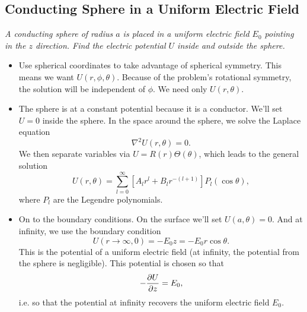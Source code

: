 \documentclass[11pt, a4paper]{article}
\renewcommand{\laplacian}{\nabla^{2}}
\begin{document}
\subsection{Conducting Sphere in a Uniform Electric Field}
\textit{A conducting sphere of radius $ a $ is placed in a uniform electric field $ E_{0} $ pointing in the $ z $ direction. Find the electric potential $ U $ inside and outside the sphere.} 

\begin{itemize}
	\item Use spherical coordinates to take advantage of spherical symmetry. This means we want $ U(r, \phi, \theta) $. Because of the problem's rotational symmetry, the solution will be independent of $ \phi $. We need only $ U(r, \theta) $. 
	
	\item The sphere is at a constant potential because it is a conductor. We'll set $ U = 0 $ inside the sphere. In the space around the sphere, we solve the Laplace equation
	\begin{equation*}
		\laplacian U(r, \theta) = 0.
	\end{equation*}
	We then separate variables via $ U = R(r)\Theta(\theta) $, which leads to the general solution
	\begin{equation*}
		U(r, \theta) = \sum_{l = 0}^{\infty} \left[A_{l}r^{l}+B_{l}r^{-(l+1)}\right]P_{l}(\cos \theta),
	\end{equation*}
	where $ P_{l} $ are the Legendre polynomials. 
	
	\item On to the boundary conditions. On the surface we'll set $ U(a, \theta) = 0 $. And at infinity, we use the boundary condition 
	\begin{equation*}
		U(r \to \infty, 0) = - E_{0}z = -E_{0}r \cos \theta.
	\end{equation*}
	This is the potential of a uniform electric field (at infinity, the potential from the sphere is negligible). This potential is chosen so that
	\begin{equation*}
		- \pdv{U}{z} = E_{0},
	\end{equation*}
	i.e. so that the potential at infinity recovers the uniform electric field $ E_{0} $. 
	

\end{itemize}
\end{document}
